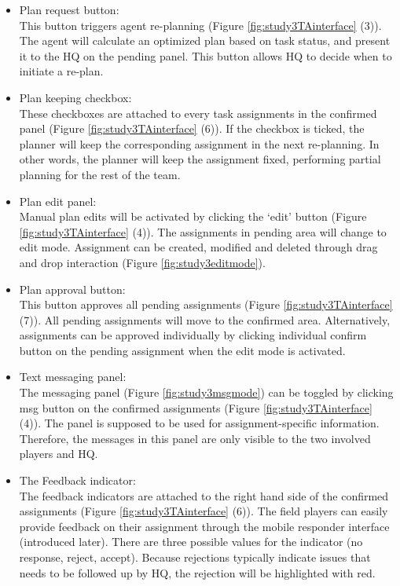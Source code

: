 \begin{itemize}
\item Plan request button: \\
This button triggers agent re-planning (Figure \ref{fig:study3TAinterface} (3)). The agent will calculate an optimized plan based on task status, and present it to the HQ on the pending panel. This button allows HQ to decide when to initiate a re-plan. \\

\item Plan keeping checkbox:\\
These checkboxes are attached to every task assignments in the confirmed panel (Figure \ref{fig:study3TAinterface} (6)). If the checkbox is ticked, the planner will keep the corresponding assignment in the next re-planning. In other words, the planner will keep the assignment fixed, performing partial planning for the rest of the team. 

\item Plan edit panel: \\
Manual plan edits will be activated by clicking the `edit' button (Figure \ref{fig:study3TAinterface} (4)). The assignments in pending area will change to edit mode. Assignment can be created, modified and deleted through drag and drop interaction (Figure \ref{fig:study3editmode}). \\

\item Plan approval button: \\
This button approves all pending assignments (Figure \ref{fig:study3TAinterface} (7)). All pending assignments will move to the confirmed area. Alternatively, assignments can be approved individually by clicking individual confirm button on the pending assignment when the edit mode is activated. \\

\item Text messaging panel:\\
The messaging panel (Figure \ref{fig:study3msgmode}) can be toggled by clicking msg button on the confirmed assignments (Figure \ref{fig:study3TAinterface} (4)). The panel is supposed to be used for assignment-specific information. Therefore, the messages in this panel are only visible to the two involved players and HQ.\\

\item The Feedback indicator:\\
The feedback indicators are attached to the right hand side of the confirmed assignments (Figure  \ref{fig:study3TAinterface} (6)). The field players can easily provide feedback on their assignment through the mobile responder interface (introduced later). There are three possible values for the indicator (no response, reject, accept). Because rejections typically indicate issues that needs to be followed up by HQ, the rejection will be highlighted with red. \\


\end{itemize}

